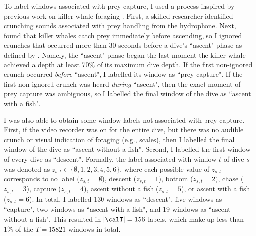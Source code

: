 To label windows associated with prey capture, I used a process inspired by previous work on killer whale foraging \citep{Wright:2017, Tennessen:2019a}. First, a skilled researcher identified crunching sounds associated with prey handling from the hydrophone.
%
Next, \citet{Wright:2017} found that killer whales catch prey immediately before ascending, so I ignored crunches that occurred more than 30 seconds before a dive's ``ascent" phase as defined by \citet{Tennessen:2019a}. Namely, the ``ascent" phase began the last moment the killer whale achieved a depth at least 70\% of its maximum dive depth. If the first non-ignored crunch occurred \textit{before} ``ascent", I labelled its window as ``prey capture". If the first non-ignored crunch was heard \textit{during} ``ascent", then the exact moment of prey capture was ambiguous, so I labelled the final window of the dive as ``ascent with a fish". 

I was also able to obtain some window labels not associated with prey capture. First, if the video recorder was on for the entire dive, but there was no audible crunch or visual indication of foraging (e.g., scales), then I labelled the final window of the dive as ``ascent without a fish". Second, I labelled the first window of every dive as ``descent". Formally, the label associated with window $t$ of dive $s$ was denoted as $z_{s,t} \in \{\emptyset,1,2,3,4,5,6\}$, where each possible value of $z_{s,t}$ corresponds to no label ($z_{s,t} = \emptyset$), descent ($z_{s,t} = 1$), bottom ($z_{s,t} = 2$), chase ($z_{s,t} = 3$), capture ($z_{s,t} = 4$), ascent without a fish ($z_{s,t} = 5$), or ascent with a fish ($z_{s,t} = 6$). In total, I labelled 130 windows as ``descent", five windows as ``capture", two windows as ``ascent with a fish", and 19 windows as ``ascent without a fish". This resulted in $|\calT| = 156$ labels, which make up less than $1\%$ of the $T = 15821$ windows in total.

